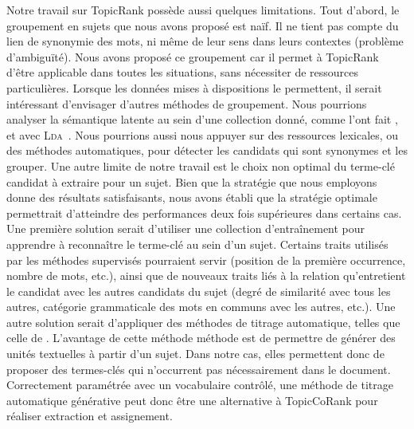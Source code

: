     Notre travail sur TopicRank possède aussi quelques limitations. Tout
    d'abord, le groupement en sujets que nous avons proposé est naïf. Il ne
    tient pas compte du lien de synonymie des mots, ni même de leur sens dans
    leurs contextes (problème d'ambiguïté). Nous avons proposé ce groupement car
    il permet à TopicRank d'être applicable dans toutes les situations, sans
    nécessiter de ressources particulières. Lorsque les données mises à
    dispositions le permettent, il serait intéressant d'envisager d'autres
    méthodes de groupement. Nous pourrions analyser la sémantique latente au
    sein d'une collection donné, comme l'ont fait
    , 
    et  avec
    \textsc{Lda}~\cite{blei2003lda}. Nous pourrions aussi nous appuyer sur des
    ressources lexicales, ou des méthodes automatiques, pour détecter les
    candidats qui sont synonymes et les grouper. Une autre limite de notre
    travail est le choix non optimal du terme-clé candidat à extraire pour un
    sujet. Bien que la stratégie que nous employons donne des résultats
    satisfaisants, nous avons établi que la stratégie optimale permettrait
    d'atteindre des performances deux fois supérieures dans certains cas. Une
    première solution serait d'utiliser une collection d'entraînement pour
    apprendre à reconnaître le terme-clé au sein d'un sujet. Certains traits
    utilisés par les méthodes supervisés pourraient servir (position de la
    première occurrence, nombre de mots, etc.), ainsi que de nouveaux traits
    liés à la relation qu'entretient le candidat avec les autres candidats du
    sujet (degré de similarité avec tous les autres, catégorie grammaticale des
    mots en communs avec les autres, etc.). Une autre solution serait
    d'appliquer des méthodes de titrage automatique, telles que celle de
    . L'avantage de cette méthode méthode est de
    permettre de générer des unités textuelles à partir d'un sujet. Dans notre
    cas, elles permettent donc de proposer des termes-clés qui n'occurrent pas
    nécessairement dans le document. Correctement paramétrée avec un vocabulaire
    contrôlé, une méthode de titrage automatique générative peut donc être une
    alternative à TopicCoRank pour réaliser extraction et assignement.


